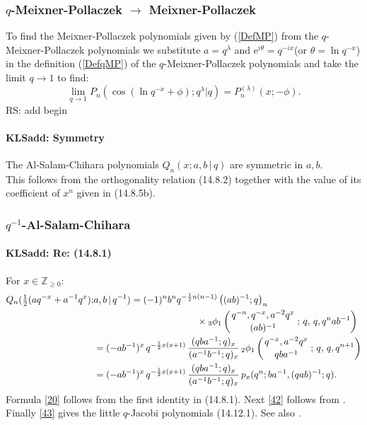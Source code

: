 \documentclass[envcountchap,graybox]{svmono}
\newcounter{rom}
\newcommand{\qhyp}[5]{\mbox{}_{#1}{\phi}_{#2}
\left(\genfrac{}{}{0pt}{}{#3}{#4}\,;\,q,\,#5\right)}
\newcommand{\e}{\textrm{e}}
\newcommand\sa{\smallskipamount}
\newcommand\sLP{\\[\sa]}
\newcommand\ZZ{\mathbb{Z}}
\newcommand\half{\frac12}
\newcommand\thalf{\tfrac12}
\newcommand\Znonneg{\ZZ_{\ge0}}
\newcommand{\qhyp}[5]{\,\mbox{}_{#1}\phi_{#2}\!\left(
  \genfrac{}{}{0pt}{}{#3}{#4};#5\right)}
\begin{document}
\subsubsection*{$q$-Meixner-Pollaczek $\rightarrow$ Meixner-Pollaczek}
To find the Meixner-Pollaczek polynomials given by (\ref{DefMP}) from the $q$-Meixner-Pollaczek
polynomials we substitute $a=q^{\lambda}$ and $\e^{i\theta}=q^{-ix}$(or $\theta=\ln q^{-x}$) in the definition
(\ref{DefqMP}) of the $q$-Meixner-Pollaczek polynomials and take the limit $q\rightarrow 1$ to find:
\begin{equation}
\lim_{q\rightarrow 1}P_n(\cos(\ln q^{-x}+\phi);q^{\lambda}|q)
=P_n^{(\lambda)}(x;-\phi).
\end{equation}
 RS: add begin\label{sec14.8}
%
\paragraph{\large\bf KLSadd: Symmetry}The Al-Salam-Chihara polynomials $Q_n(x;a,b\,|\, q)$ are symmetric in $a,b$.
\sLP
This follows from the orthogonality relation (14.8.2)
together with the value of its coefficient of $x^n$ given in (14.8.5b).
%
\subsubsection*{$q^{-1}$-Al-Salam-Chihara}
%
\paragraph{\large\bf KLSadd: Re: (14.8.1)}For $x\in\Znonneg$:
%
\begin{align}
Q_n(\thalf(aq^{-x}+a^{-1}q^x);&a,b\,|\, q^{-1})=
(-1)^n b^n q^{-\half n(n-1)}\left((ab)^{-1};q\right)_n
\nonumber\\
&\qquad\qquad\qquad\qquad\qquad\quad
\times\qhyp31{q^{-n},q^{-x},a^{-2}q^x}{(ab)^{-1}}{q,q^nab^{-1}}
\label{20}\\
&=(-ab^{-1})^x\,q^{-\half x(x+1)}\,\frac{(qba^{-1};q)_x}{(a^{-1}b^{-1};q)_x}\,
\qhyp21{q^{-x},a^{-2}q^x}{qba^{-1}}{q,q^{n+1}}
\label{42}\\
&=(-ab^{-1})^x\,q^{-\half x(x+1)}\,\frac{(qba^{-1};q)_x}{(a^{-1}b^{-1};q)_x}\,
p_x(q^n;ba^{-1},(qab)^{-1};q).
\label{43}
\end{align}
%
Formula \eqref{20} follows from the first identity in (14.8.1).
Next \eqref{42} follows from .
Finally \eqref{43} gives the little $q$-Jacobi polynomials (14.12.1).
See also .
%
\end{document}
